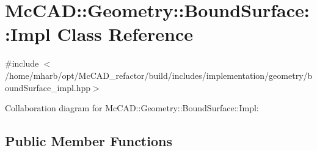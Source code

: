 \hypertarget{classMcCAD_1_1Geometry_1_1BoundSurface_1_1Impl}{}\section{Mc\+C\+AD\+:\+:Geometry\+:\+:Bound\+Surface\+:\+:Impl Class Reference}
\label{classMcCAD_1_1Geometry_1_1BoundSurface_1_1Impl}


{\ttfamily \#include $<$/home/mharb/opt/\+Mc\+C\+A\+D\+\_\+refactor/build/includes/implementation/geometry/bound\+Surface\+\_\+impl.\+hpp$>$}



Collaboration diagram for Mc\+C\+AD\+:\+:Geometry\+:\+:Bound\+Surface\+:\+:Impl\+:
\subsection*{Public Member Functions}
